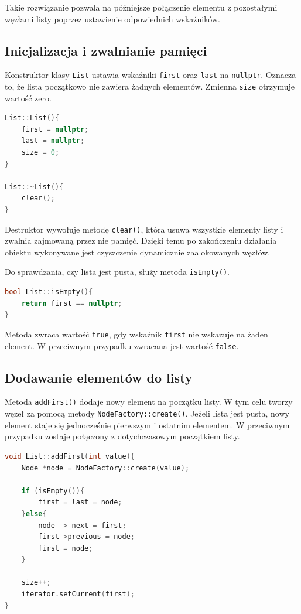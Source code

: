 Takie rozwiązanie pozwala na późniejsze połączenie elementu z pozostałymi węzłami listy poprzez ustawienie odpowiednich wskaźników.

\subsection{Inicjalizacja i zwalnianie pamięci}

Konstruktor klasy \texttt{List} ustawia wskaźniki \texttt{first} oraz \texttt{last} na \texttt{nullptr}. Oznacza to, że lista początkowo nie zawiera żadnych elementów. Zmienna \texttt{size} otrzymuje wartość zero.

\begin{lstlisting}[language=C++, caption={Konstruktor i destruktor klasy List}]
List::List(){
    first = nullptr;
    last = nullptr;
    size = 0;
}

List::~List(){
    clear();
}
\end{lstlisting}

Destruktor wywołuje metodę \texttt{clear()}, która usuwa wszystkie elementy listy i zwalnia zajmowaną przez nie pamięć. Dzięki temu po zakończeniu działania obiektu wykonywane jest czyszczenie dynamicznie zaalokowanych węzłów.

Do sprawdzania, czy lista jest pusta, służy metoda \texttt{isEmpty()}.

\begin{lstlisting}[language=C++, caption={Sprawdzanie, czy lista jest pusta}]
bool List::isEmpty(){
    return first == nullptr;
}
\end{lstlisting}

Metoda zwraca wartość \texttt{true}, gdy wskaźnik \texttt{first} nie wskazuje na żaden element. W przeciwnym przypadku zwracana jest wartość \texttt{false}.

\subsection{Dodawanie elementów do listy}

Metoda \texttt{addFirst()} dodaje nowy element na początku listy. W tym celu tworzy węzeł za pomocą metody \texttt{NodeFactory::create()}. Jeżeli lista jest pusta, nowy element staje się jednocześnie pierwszym i ostatnim elementem. W przeciwnym przypadku zostaje połączony z dotychczasowym początkiem listy.

\begin{lstlisting}[language=C++, caption={Dodawanie elementu na początku listy}]
void List::addFirst(int value){
    Node *node = NodeFactory::create(value);

    if (isEmpty()){
        first = last = node;
    }else{
        node -> next = first;
        first->previous = node;
        first = node;
    }

    size++;
    iterator.setCurrent(first);
}
\end{lstlisting}


